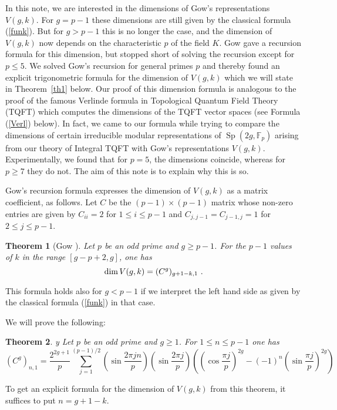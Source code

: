\documentclass{amsart}
\newtheorem{thm}{Theorem}
\begin{document}
In this 
note,  
we are interested in the dimensions of Gow's
representations $V(g,k)$. 
For $g=p-1$ these dimensions are still given by the classical formula
(\ref{funk}). But for $g>p-1$ this is no longer the case, 
and the dimension of $V(g,k)$  
now depends 
on the characteristic $p$ of
the field $K$. Gow gave a recursion formula for 
this dimension,  
 but stopped short of solving the recursion except for
$p\leq 5$. 
We solved Gow's recursion for general primes $p$ and thereby found an
explicit trigonometric formula for the dimension of $V(g,k)$ which we
will state in Theorem~\ref{th1} below. 
 Our proof of this dimension formula is analogous to the proof of the famous
Verlinde formula in Topological Quantum Field Theory (TQFT)
which computes the dimensions of the TQFT vector spaces (see Formula
(\ref{Verl}) below).   
 In fact, we came to 
our  formula while trying to compare the
dimensions of certain irreducible modular representations of
$\operatorname{Sp}(2g,{{\mathbb{F}}}_p)$ arising from our theory of 
Integral TQFT \cite{G,GM,GM4} with Gow's representations
$V(g,k)$. Experimentally, we 
found that for  $p=5$, the dimensions coincide, whereas for $p\geq 7$
they do not.   
The aim of this note is to explain why this is so.

Gow's recursion formula expresses the dimension of $V(g,k)$ as a
matrix coefficient, as follows. Let $C$ be the $(p-1)\times(p-1)$
matrix whose non-zero entries are given by $C_{ii}=2$ for $1\leq i\leq
p-1$ and $C_{j,j-1}=C_{j-1,j}=1$ for 
 $2\leq j\leq p-1$.

\begin{thm}[Gow \cite{Go}] 
Let $p$ be an odd prime and $g\geq p-1$.
 For the $p-1$ values of $k$ in the range $[g-p+2,g]$, one has 
\begin{equation*}{\label{{Gowf}}{
	\if{n} y
		\smash{\makebox[0pt]{\hspace{-0.5in}
			\raisebox{8pt}{\tt\tiny {{Gowf}}}}}
	\fi
}}
\dim V(g, k)=  (C^g)_{g+1-k,1}~.
\end{equation*}
\end{thm}

 This formula holds also for $g<p-1$ if we
interpret the left hand side as given by the classical formula
(\ref{funk}) in that case.
\vskip 8pt

We will prove the following:
\begin{thm}{\label{{th1}}{
	 y
	\fi
}} 
Let $p$ be an odd prime and $g\geq 1$. For $1\leq n\leq p-1$ one has 
$$(C^g)_{n,1}= \frac{2^{2g+1}}{p} \sum_{j=1}^{(p-1)/2} \left(\sin\frac{2\pi
  jn}{p}\right) \left(\sin\frac{2\pi j}{p}\right) \left(
\left(\cos\frac{\pi j}{p}\right)^{2g} - (-1)^{n} \left(\sin\frac{\pi
    j}{p}\right)^{2g}\right)$$
\end{thm}
To get an explicit formula for the dimension of $V(g,k)$ from this
theorem, it suffices to put $n=g+1-k$.
\end{document}
